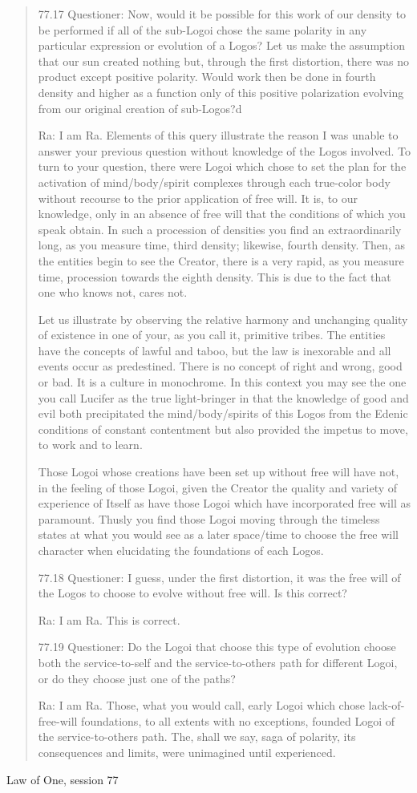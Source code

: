 \documentclass{report}
\begin{document}
\blockquote{77.17 Questioner: Now, would it be possible for this work of our
density to be performed if all of the sub-Logoi chose the same polarity in any
particular expression or evolution of a Logos? Let us make the assumption that
our sun created nothing but, through the first distortion, there was no product
except positive polarity. Would work then be done in fourth density and higher
as a function only of this positive polarization evolving from our original
creation of sub-Logos?d

Ra: I am Ra. Elements of this query illustrate the reason I was unable to answer
your previous question without knowledge of the Logos involved. To turn to your
question, there were Logoi which chose to set the plan for the activation of
mind/body/spirit complexes through each true-color body without recourse to the
prior application of free will. It is, to our knowledge, only in an absence of
free will that the conditions of which you speak obtain. In such a procession of
densities you find an extraordinarily long, as you measure time, third density;
likewise, fourth density. Then, as the entities begin to see the Creator, there
is a very rapid, as you measure time, procession towards the eighth density.
This is due to the fact that one who knows not, cares not.

Let us illustrate by observing the relative harmony and unchanging quality of
existence in one of your, as you call it, primitive tribes. The entities have
the concepts of lawful and taboo, but the law is inexorable and all events occur
as predestined. There is no concept of right and wrong, good or bad. It is a
culture in monochrome. In this context you may see the one you call Lucifer as
the true light-bringer in that the knowledge of good and evil both precipitated
the mind/body/spirits of this Logos from the Edenic conditions of constant
contentment but also provided the impetus to move, to work and to learn.

Those Logoi whose creations have been set up without free will have not, in the
feeling of those Logoi, given the Creator the quality and variety of experience
of Itself as have those Logoi which have incorporated free will as paramount.
Thusly you find those Logoi moving through the timeless states at what you would
see as a later space/time to choose the free will character when elucidating the
foundations of each Logos.

77.18 Questioner: I guess, under the first distortion, it was the free will of
the Logos to choose to evolve without free will. Is this correct?

Ra: I am Ra. This is correct.

77.19 Questioner: Do the Logoi that choose this type of evolution choose both
the service-to-self and the service-to-others path for different Logoi, or do
they choose just one of the paths?

Ra: I am Ra. Those, what you would call, early Logoi which chose
lack-of-free-will foundations, to all extents with no exceptions, founded Logoi
of the service-to-others path. The, shall we say, saga of polarity, its
consequences and limits, were unimagined until experienced.
}{Law of One, session 77\cite{lawofone}}
\end{document}
